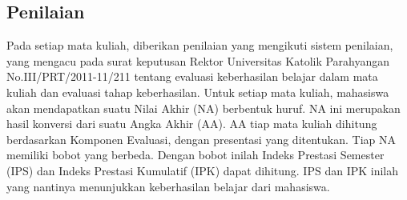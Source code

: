 \subsection{Penilaian}
\label{sec:penilaian}

Pada setiap mata kuliah, diberikan penilaian yang mengikuti sistem penilaian, yang mengacu pada surat keputusan Rektor Universitas Katolik Parahyangan No.III/PRT/2011-11/211 tentang evaluasi keberhasilan belajar dalam mata kuliah dan evaluasi tahap keberhasilan. Untuk setiap mata kuliah, mahasiswa akan mendapatkan suatu Nilai Akhir (NA) berbentuk huruf. NA ini merupakan hasil konversi dari suatu Angka Akhir (AA). AA tiap mata kuliah dihitung berdasarkan Komponen Evaluasi, dengan presentasi yang ditentukan. Tiap NA memiliki bobot yang berbeda. Dengan bobot inilah Indeks Prestasi Semester (IPS) dan Indeks Prestasi Kumulatif (IPK) dapat dihitung. IPS dan IPK inilah yang nantinya menunjukkan keberhasilan belajar dari mahasiswa.

